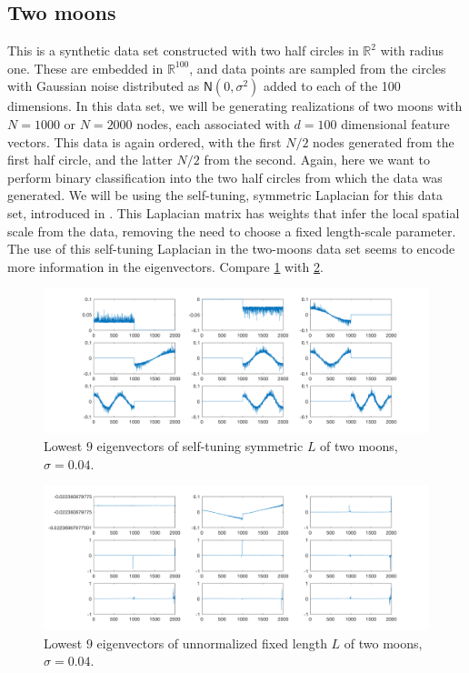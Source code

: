 \documentclass{siamart1116}
\begin{document}
    \subsection{Two moons}
        This is a synthetic data set constructed with two half circles in $\mathbb{R}^2$ with radius one. These are embedded in $\mathbb{R}^{100}$, and data points are sampled from the circles with Gaussian noise distributed as $\mathsf{N}(0,\sigma^2)$ added to each of the 100 dimensions. In this data set, we will be generating realizations of two moons with $N=1000$ or $N=2000$ nodes, each associated with $d=100$ dimensional feature vectors. This data is again ordered, with the first $N/2$ nodes generated from the first half circle, and the latter $N/2$ from the second. Again, here we want to perform binary classification into the two half circles from which the data was generated. We will be using the self-tuning, symmetric Laplacian for this data set, introduced in \cite{SelfTuning}. This Laplacian matrix has weights that infer the local spatial scale from the data, removing the need to choose a fixed length-scale parameter. The use of this self-tuning Laplacian in the two-moons data set seems to encode more information in the eigenvectors. Compare \cref{fig:moon_spec} with \cref{fig:moon_un_spec}.

        \begin{figure}[!htb]
        \caption{\label{fig:moon_spec} Lowest $9$ eigenvectors of self-tuning symmetric $L$ of two moons, $\sigma = 0.04$.}
        \includegraphics[width=\linewidth]{laplacians/moon_laplacian.png}
        \end{figure}

        \begin{figure}[!htb]
        \caption{\label{fig:moon_un_spec} Lowest $9$ eigenvectors of unnormalized fixed length $L$ of two moons, $\sigma = 0.04$.}
        \includegraphics[width=\linewidth]{laplacians/moon_laplacian_un.png}
        \end{figure}
\end{document}
